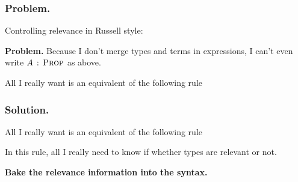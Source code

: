 \begin{frame}
  \frametitle{Problem.}

  \pause Controlling relevance in Russell style:
  \begin{tightcenter}
    \begin{prooftree}
    \end{prooftree}
    \hspace{3em}
    \begin{prooftree}
    \end{prooftree}
  \end{tightcenter}

  \pause \textbf{Problem.} Because I don't merge types and terms in
  expressions, I can't even write $A\,:\,\textsc{Prop}$ as above.

  \pause All I really want is an equivalent of the following rule
  \begin{tightcenter}
    \begin{prooftree}
    \end{prooftree}
  \end{tightcenter}
\end{frame}

\begin{frame}
  \frametitle{Solution.}

  \pause All I really want is an equivalent of the following rule
  \begin{tightcenter}
    \begin{prooftree}
    \end{prooftree}
  \end{tightcenter}

  \pause In this rule, all I really need to know if whether types are
  relevant or not.
  \begin{tightcenter}
    \textbf{Bake the relevance information into the syntax.}
  \end{tightcenter}
\end{frame}

